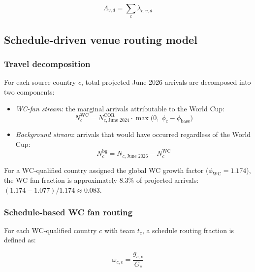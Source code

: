 \documentclass[12pt]{article}
\begin{document}
\begin{equation}
  \Lambda_{v,d} = \sum_{c} \lambda_{c,v,d}
\end{equation}

\subsection*{Schedule-driven venue routing model}

\subsubsection*{Travel decomposition}

For each source country $c$, total projected June 2026 arrivals
are decomposed into two components:

\begin{itemize}
  \item \textit{WC-fan stream}: the marginal arrivals attributable to
    the World Cup:
    \begin{equation}
      N_c^{\text{WC}} = N_{c,\text{June 2024}}^{\text{COR}} \cdot
        \max\!\bigl(0,\; \phi_c - \phi_{\text{base}}\bigr)
      \label{eq:wc_fan_stream}
    \end{equation}

  \item \textit{Background stream}: arrivals that would have occurred
    regardless of the World Cup:
    \begin{equation}
      N_c^{\text{bg}} = N_{c,\text{June 2026}} - N_c^{\text{WC}}
      \label{eq:bg_stream}
    \end{equation}
\end{itemize}

For a WC-qualified country assigned the global WC growth factor
($\phi_{\text{WC}} = 1.174$), the WC fan fraction is approximately
$8.3\%$ of projected arrivals:
$(1.174 - 1.077)/1.174 \approx 0.083$.

\subsubsection*{Schedule-based WC fan routing}

For each WC-qualified country $c$ with team $t_c$, a
schedule routing fraction is defined as:

\begin{equation}
  \omega_{c,v} = \frac{g_{c,v}}{G_c}
  \label{eq:schedule_routing}
\end{equation}
\end{document}
